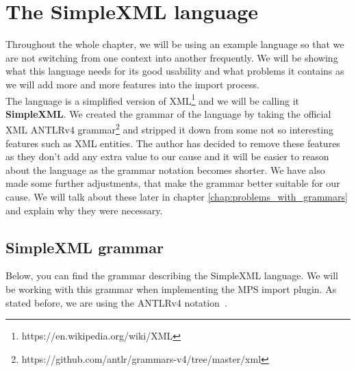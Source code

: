 \section{The SimpleXML language}

Throughout the whole chapter, we will be using an example language so that we are not switching from one context into another frequently.
We will be showing what this language needs for its good usability and what problems it contains as we will add more and more features into the import process.
\\

The language is a simplified version of XML\footnote{https://en.wikipedia.org/wiki/XML} and we will be calling it \textbf{SimpleXML}.
We created the grammar of the language by taking the official XML ANTLRv4 grammar\footnote{https://github.com/antlr/grammars-v4/tree/master/xml} and stripped it down from some not so interesting features such as XML entities.
The author has decided to remove these features as they don't add any extra value to our cause and it will be easier to reason about the language as the grammar notation becomes shorter.
We have also made some further adjustments, that make the grammar better suitable for our cause.
We will talk about these later in chapter \ref{chap:problems_with_grammars} and explain why they were necessary.

\newpage

\subsection{SimpleXML grammar}
\label{chap:simplexml_grammar}

Below, you can find the grammar describing the SimpleXML language.
We will be working with this grammar when implementing the MPS import plugin.
As stated before, we are using the ANTLRv4 notation~\cite{ANTLR4reference}.

